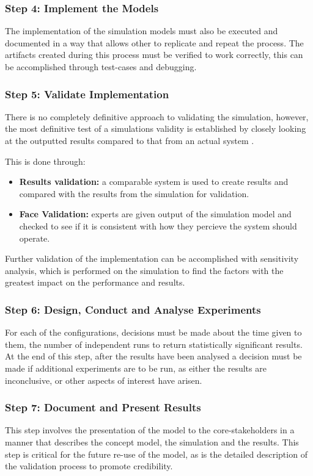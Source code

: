\subsubsection{Step 4: Implement the Models}
The implementation of the simulation models must also be executed and documented in a way that allows other to replicate and repeat the process.
The artifacts created during this process must be verified to work correctly, this can be accomplished through test-cases and debugging.

\subsubsection{Step 5: Validate Implementation}
There is no completely definitive approach to validating the simulation,
however, the most definitive test of a simulations validity is established by closely looking at the outputted results compared to that from an actual system \cite{Law2005}.

This is done through:
\begin{itemize}
  \item \textbf{Results validation: } a comparable system is used to create results and compared with the results from the simulation for validation.
  \item \textbf{Face Validation: } experts are given output of the simulation model and checked to see if it is consistent with how they percieve the system should operate.
\end{itemize}

Further validation of the implementation can be accomplished with sensitivity analysis,
which is performed on the simulation to find the factors with the greatest impact on the performance and results.

\subsubsection{Step 6: Design, Conduct and Analyse Experiments}
For each of the configurations, decisions must be made about the time given to them, the number of independent runs to return statistically significant results.
At the end of this step, after the results have been analysed a decision must be made if additional experiments are to be run,
as either the results are inconclusive, or other aspects of interest have arisen.

\subsubsection{Step 7: Document and Present Results}
This step involves the presentation of the model to the core-stakeholders in a manner that describes the concept model, the simulation and the results.
This step is critical for the future re-use of the model, as is the detailed description of the validation process to promote credibility.


